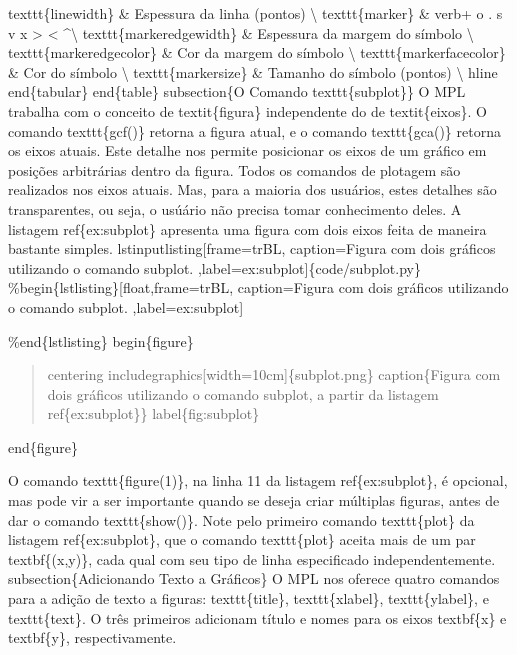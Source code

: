 \documentclass[a4paper,10pt,brazil]{sphinxmanual}
\begin{document}
texttt\{linewidth\} \& Espessura da linha (pontos) \textbackslash{}
texttt\{marker\} \& verb\textbar{}+ o . s v x \textgreater{} \textless{} \textasciicircum{}\textbar{}\textbackslash{}
texttt\{markeredgewidth\} \& Espessura da margem do símbolo \textbackslash{}
texttt\{markeredgecolor\} \& Cor da margem do símbolo \textbackslash{}
texttt\{markerfacecolor\} \& Cor do símbolo \textbackslash{}
texttt\{markersize\} \& Tamanho do símbolo (pontos) \textbackslash{}
hline
end\{tabular\}
end\{table\}
subsection\{O Comando texttt\{subplot\}\}
O MPL trabalha com o conceito de textit\{figura\} independente do de textit\{eixos\}. O comando texttt\{gcf()\} retorna a figura atual, e o comando texttt\{gca()\} retorna os eixos atuais. Este detalhe nos permite posicionar os eixos de um gráfico em posições arbitrárias dentro da figura. Todos os comandos de plotagem são realizados nos eixos atuais. Mas, para a maioria dos usuários, estes detalhes são transparentes, ou seja, o usúário não precisa tomar conhecimento deles. A listagem ref\{ex:subplot\} apresenta uma figura com dois eixos feita de maneira bastante simples.
lstinputlisting{[}frame=trBL, caption=Figura com dois gráficos utilizando o comando subplot. ,label=ex:subplot{]}\{code/subplot.py\}
\%begin\{lstlisting\}{[}float,frame=trBL, caption=Figura com dois gráficos utilizando o comando subplot. ,label=ex:subplot{]}

\%end\{lstlisting\}
begin\{figure\}
\begin{quote}

centering
includegraphics{[}width=10cm{]}\{subplot.png\}
caption\{Figura com dois gráficos utilizando o comando subplot, a partir da listagem ref\{ex:subplot\}\}
label\{fig:subplot\}
\end{quote}

end\{figure\}

O comando texttt\{figure(1)\}, na linha 11 da listagem ref\{ex:subplot\}, é opcional, mas pode vir a ser importante quando se deseja criar múltiplas figuras, antes de dar o comando texttt\{show()\}. Note pelo primeiro comando texttt\{plot\} da listagem ref\{ex:subplot\}, que o comando texttt\{plot\} aceita mais de um par textbf\{(x,y)\}, cada qual com seu tipo de linha especificado independentemente.
subsection\{Adicionando Texto a Gráficos\}
O MPL nos oferece quatro comandos para a adição de texto a figuras: texttt\{title\}, texttt\{xlabel\}, texttt\{ylabel\}, e texttt\{text\}. O três primeiros adicionam título e nomes para os eixos textbf\{x\} e textbf\{y\}, respectivamente.
\end{document}
